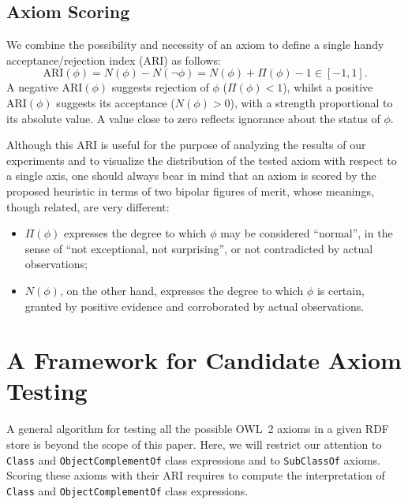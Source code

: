 \documentclass{sig-alternate}
\begin{document}
\subsection{Axiom Scoring}
We combine the possibility and necessity of an axiom to define
a single handy acceptance/rejection index (ARI) as follows:
\begin{equation}\label{eq:ARI}
  \mathrm{ARI}(\phi) = N(\phi) - N(\neg\phi) = N(\phi) + \Pi(\phi) - 1 \in [-1, 1].
\end{equation}
A negative $\mathrm{ARI}(\phi)$ suggests rejection of $\phi$ ($\Pi(\phi)<1$),
whilst a positive $\mathrm{ARI}(\phi)$ suggests its acceptance ($N(\phi)>0$),
with a strength proportional to its absolute value. A value close to zero
reflects ignorance about the status of $\phi$.

Although this ARI is useful for the purpose of analyzing the results of our
experiments and to visualize the distribution of the tested axiom with respect
to a single axis, one should always bear in mind that an axiom is scored by
the proposed heuristic in terms of two bipolar figures of merit,
whose meanings, though related, are very different:
\begin{itemize}
\item $\Pi(\phi)$ expresses the degree to which $\phi$ may be considered ``normal'',
  in the sense of ``not exceptional, not surprising'', or not contradicted by
  actual observations;
\item $N(\phi)$, on the other hand, expresses the degree to which $\phi$ is
  certain, granted by positive evidence and corroborated by actual observations.
\end{itemize}


\section{A Framework for Candidate Axiom Testing}
\label{OWL2SPARQL} 




A general algorithm for testing all the possible OWL~2 axioms in a given RDF store is beyond the scope of this paper. 
Here, we will restrict our attention to \texttt{Class} and \texttt{ObjectComplementOf} class expressions and to \texttt{SubClassOf} axioms. 
Scoring these axioms with their ARI requires to compute the interpretation of \texttt{Class} and \texttt{ObjectComplementOf} class expressions. 
 
\end{document}
